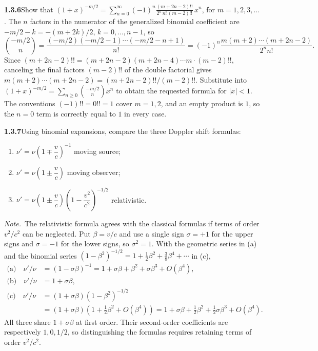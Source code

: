 \par\bigskip
\noindent\textbf{1.3.6}\quad Show that
$\displaystyle(1+x)^{-m/2}=\sum_{n=0}^{\infty}(-1)^{n}
\frac{(m+2n-2)!!}{2^{n}\,n!\,(m-2)!!}\,x^{n}$, for $m=1,2,3,\ldots$ .
\solution
The $n$ factors in the numerator of the generalized binomial coefficient
are $-m/2-k=-(m+2k)/2$, $k=0,\ldots,n-1$, so
\[
 \binom{-m/2}{n}
 =\frac{(-m/2)(-m/2-1)\cdots(-m/2-n+1)}{n!}
 =(-1)^n\frac{m(m+2)\cdots(m+2n-2)}{2^n n!}.
\]
Since $(m+2n-2)!!=(m+2n-2)(m+2n-4)\cdots m\cdot(m-2)!!$, canceling the
final factors $(m-2)!!$ of the double factorial gives
$m(m+2)\cdots(m+2n-2)=(m+2n-2)!!/(m-2)!!$.
Substitute into $(1+x)^{-m/2}=\sum_{n\ge0}\binom{-m/2}{n}x^n$
to obtain the requested formula for $|x|<1$.
The conventions $(-1)!!=0!!=1$ cover $m=1,2$, and an empty product
is $1$, so the $n=0$ term is correctly equal to $1$ in every case.


\par\bigskip
\noindent\textbf{1.3.7}\quad Using binomial expansions, compare the three
Doppler shift formulas:
\begin{enumerate}
\item[(a)] $\nu'=\nu\left(1\mp\dfrac{v}{c}\right)^{-1}$ moving source;
\item[(b)] $\nu'=\nu\left(1\pm\dfrac{v}{c}\right)$ moving observer;
\item[(c)] $\nu'=\nu\left(1\pm\dfrac{v}{c}\right)
  \left(1-\dfrac{v^{2}}{c^{2}}\right)^{-1/2}$ relativistic.
\end{enumerate}

\emph{Note.}~The relativistic formula agrees with the classical formulas if
terms of order $v^{2}/c^{2}$ can be neglected.
\solution
Put $\beta=v/c$ and use a single sign $\sigma=+1$ for the upper
signs and $\sigma=-1$ for the lower signs, so $\sigma^2=1$. With the
geometric series in (a) and the binomial series
$(1-\beta^2)^{-1/2}=1+\frac12\beta^2+\frac38\beta^4+\cdots$ in (c),
\[
 \begin{aligned}
 \text{(a)}\quad\nu'/\nu&=(1-\sigma\beta)^{-1}
    =1+\sigma\beta+\beta^2+\sigma\beta^3+O(\beta^4),\\
 \text{(b)}\quad\nu'/\nu&=1+\sigma\beta,\\
 \text{(c)}\quad\nu'/\nu&=(1+\sigma\beta)(1-\beta^2)^{-1/2}\\
    &=(1+\sigma\beta)(1+\tfrac12\beta^2+O(\beta^4))
     =1+\sigma\beta+\tfrac12\beta^2+\tfrac12\sigma\beta^3+O(\beta^4).
 \end{aligned}
\]
All three share $1+\sigma\beta$ at first order. Their second-order
coefficients are respectively $1,0,1/2$, so distinguishing the formulas
requires retaining terms of order $v^2/c^2$.


